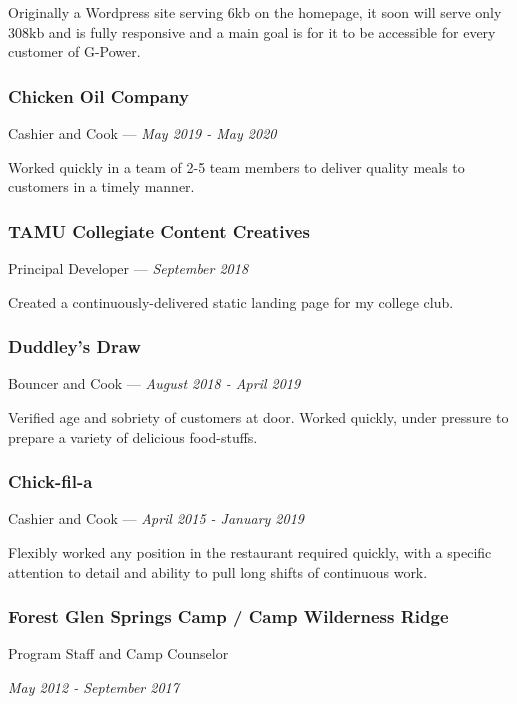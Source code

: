 \documentclass[letterpaper,10pt]{article}
\begin{document}
    Originally a Wordpress site serving 6kb on the homepage, it soon will serve only 308kb and is fully responsive and a main goal is for it to be accessible for every customer of G-Power.

    \subsubsection{Chicken Oil Company}
    \hfill Cashier and Cook --- \emph{May 2019 - May 2020}

    Worked quickly in a team of 2-5 team members to deliver quality meals to customers in a timely manner.

    \subsubsection{TAMU Collegiate Content Creatives}
    \hfill Principal Developer --- \emph{September 2018}

    Created a continuously-delivered static landing page for my college club.

    \subsubsection{Duddley's Draw}
    \hfill Bouncer and Cook --- \emph{August 2018 - April 2019}

    Verified age and sobriety of customers at door. Worked quickly, under pressure to prepare a variety of delicious food-stuffs.


    \subsubsection{Chick-fil-a}
    \hfill Cashier and Cook --- \emph{April 2015 - January 2019}

    Flexibly worked any position in the restaurant required quickly, with a specific attention to detail and ability to pull long shifts of continuous work.

    \subsubsection{Forest Glen Springs Camp / Camp Wilderness Ridge}
    \hfill Program Staff and Camp Counselor 
    
    \hfill \emph{May 2012 - September 2017}
\end{document}
